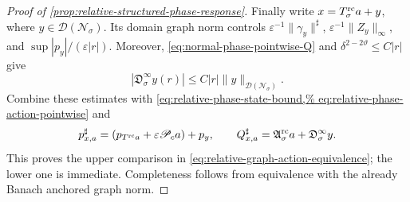 \begin{proof}[Proof of
\cref{prop:relative-structured-phase-response}]
Finally write \(x=T_\sigma^{\rm rc}a+y\), where
\(y\in\mathcal D(\mathscr N_\sigma)\).  Its domain graph norm controls
\(\varepsilon^{-1}\|\gamma_y\|^\sharp\),
\(\varepsilon^{-1}\|Z_y\|_\infty\), and
\(\sup|p_y|/(\varepsilon|r|)\).  Moreover,
\cref{eq:normal-phase-pointwise-Q} and
\(\delta^{2-2\vartheta}\le C|r|\) give
\[
 |\mathfrak D_\sigma^\infty y(r)|
 \le C|r|\|y\|_{\mathcal D(\mathscr N_\sigma)}.
\]
Combine these estimates with
\cref{eq:relative-phase-state-bound,%
eq:relative-phase-action-pointwise} and
\[
 p_{x,a}^\sharp
 =(p_{T^{\rm rc}a}+\varepsilon\mathscr P_ca)+p_y,
 \qquad
 Q_{x,a}^\sharp
 =\mathfrak A_\sigma^{\rm rc}a+\mathfrak D_\sigma^\infty y.
\]
This proves the upper comparison in
\cref{eq:relative-graph-action-equivalence}; the lower one is immediate.
Completeness follows from equivalence with the already Banach anchored
graph norm.
\end{proof}

